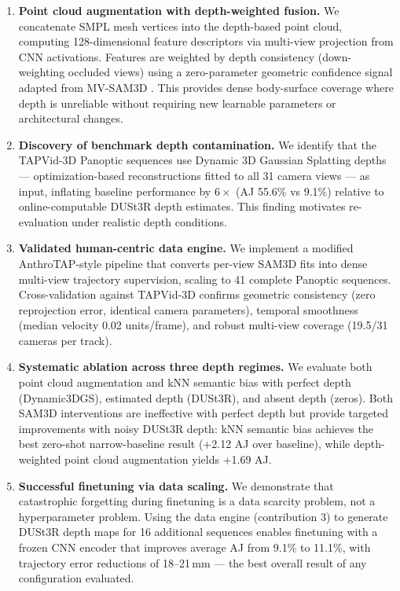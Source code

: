 \documentclass[12pt, a4paper, oneside]{report}
\begin{document}
\begin{enumerate}
    \item \textbf{Point cloud augmentation with depth-weighted fusion.} We concatenate SMPL mesh vertices into the depth-based point cloud, computing 128-dimensional feature descriptors via multi-view projection from CNN activations. Features are weighted by depth consistency (down-weighting occluded views) using a zero-parameter geometric confidence signal adapted from MV-SAM3D \cite{li2026mvsam3dadaptivemultiviewfusion}. This provides dense body-surface coverage where depth is unreliable without requiring new learnable parameters or architectural changes.

    \item \textbf{Discovery of benchmark depth contamination.} We identify that the TAPVid-3D Panoptic sequences use Dynamic 3D Gaussian Splatting depths --- optimization-based reconstructions fitted to all 31 camera views --- as input, inflating baseline performance by $6\times$ (AJ 55.6\% vs 9.1\%) relative to online-computable DUSt3R depth estimates. This finding motivates re-evaluation under realistic depth conditions.

    \item \textbf{Validated human-centric data engine.} We implement a modified AnthroTAP-style pipeline that converts per-view SAM3D fits into dense multi-view trajectory supervision, scaling to 41 complete Panoptic sequences. Cross-validation against TAPVid-3D confirms geometric consistency (zero reprojection error, identical camera parameters), temporal smoothness (median velocity 0.02 units/frame), and robust multi-view coverage (19.5/31 cameras per track).

    \item \textbf{Systematic ablation across three depth regimes.} We evaluate both point cloud augmentation and kNN semantic bias with perfect depth (Dynamic3DGS), estimated depth (DUSt3R), and absent depth (zeros). Both SAM3D interventions are ineffective with perfect depth but provide targeted improvements with noisy DUSt3R depth: kNN semantic bias achieves the best zero-shot narrow-baseline result (+2.12 AJ over baseline), while depth-weighted point cloud augmentation yields +1.69 AJ.

    \item \textbf{Successful finetuning via data scaling.} We demonstrate that catastrophic forgetting during finetuning is a data scarcity problem, not a hyperparameter problem. Using the data engine (contribution 3) to generate DUSt3R depth maps for 16 additional sequences enables finetuning with a frozen CNN encoder that improves average AJ from 9.1\% to 11.1\%, with trajectory error reductions of 18--21\,mm --- the best overall result of any configuration evaluated.
\end{enumerate}
\end{document}
